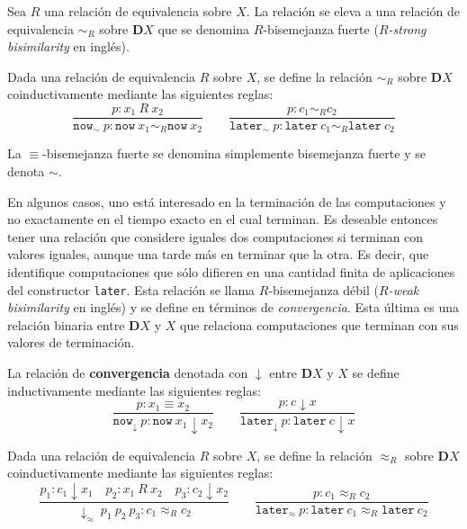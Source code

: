 Sea $R$ una relación de equivalencia sobre $X$. La relación se eleva a una relación de equivalencia $\sim_R$ sobre $\mathbf{D}X$ que se denomina $R$-bisemejanza fuerte (\textit{$R$-strong bisimilarity} en inglés). 

\begin{definition}
Dada una relación de equivalencia $R$ sobre $X$, se define la relación $\sim_R$ sobre $\mathbf{D}X$ coinductivamente mediante las siguientes reglas:
\begin{equation*}
\dfrac{p : x_1 \ R \ x_2}{\mathtt{now}_{\sim} \ p : \mathtt{now} \ x_1 \sim_R \mathtt{now} \ x_2}  	\qquad  	\dfrac{p : c_1 \sim_R c_2}{\mathtt{later}_{\sim} \ p : \mathtt{later} \ c_1 \sim_R \mathtt{later} \ c_2}
\end{equation*}
\end{definition}

La $\equiv$-bisemejanza fuerte se denomina simplemente bisemejanza fuerte y se denota $\sim$.

En algunos casos, uno está interesado en la terminación de las computaciones y no exactamente en el tiempo exacto en el cual terminan. Es deseable entonces tener una relación que considere iguales dos computaciones si terminan con valores iguales, aunque una tarde más en terminar que la otra. Es decir, que identifique computaciones que sólo difieren en una cantidad finita de aplicaciones del constructor \texttt{later}. Esta relación se llama $R$-bisemejanza débil (\textit{$R$-weak bisimilarity} en inglés) y se define en términos de \textit{convergencia}. Esta última es una relación binaria entre $\mathbf{D}X$ y $X$ que relaciona computaciones que terminan con sus valores de terminación. 

\begin{definition}[Convergencia]
La relación de \textbf{convergencia} denotada con $\downarrow$ entre $\mathbf{D}X$ y $X$ se define inductivamente mediante las siguientes reglas:
\begin{equation*}
\dfrac{p : x_1 \equiv x_2}{\mathtt{now}_{\downarrow}  \ p : \mathtt{now} \ x_1 \downarrow x_2}  	\qquad  	\dfrac{p : c \downarrow x}{\mathtt{later}_{\downarrow} \ p : \mathtt{later} \ c \downarrow x}
\end{equation*}
\end{definition}

\begin{definition}
Dada una relación de equivalencia $R$ sobre $X$, se define la relación $\approx_R$ sobre $\mathbf{D}X$ coinductivamente mediante las siguientes reglas:
\begin{equation*}
\dfrac{p_1 : c_1 \downarrow x_1 \quad p_2 : x_1 \ R \ x_2 \quad p_3 : c_2 \downarrow x_2}{\downarrow_{\approx} \ p_1 \ p_2 \ p_3 : c_1 \approx_R c_2}  	\qquad  	\dfrac{p : c_1 \approx_R c_2}{\mathtt{later}_{\approx} \ p : \mathtt{later} \ c_1 \approx_R \mathtt{later} \ c_2}
\end{equation*}
\end{definition}

